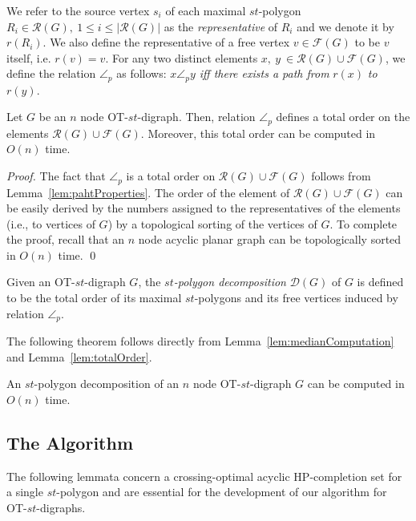 \documentclass{myllncs-mixalis}
\begin{document}
We refer to the source vertex $s_i$ of each maximal $st$-polygon
$R_i \in \mathcal{R}(G),~ 1 \leq i \leq |\mathcal{R}(G)|$ as the
\emph{representative} of $R_i$ and we denote it by $r(R_i)$. We also
define the representative of a free vertex $v\in \mathcal{F}(G)$ to
be $v$ itself, i.e. $r(v)=v$. For any two distinct elements $x, ~y~
\in \mathcal{R}(G) \cup \mathcal{F}(G)$, we define the  relation
$\angle_p$ as follows: \emph{$x \angle_p y$ iff there exists a path
from}  $r(x)$ \emph{to} $r(y)$.

\begin{lemma}
\label{lem:totalOrder}
 Let $G$ be an $n$ node OT-$st$-digraph. Then,
relation $\angle_p$ defines a total order on the elements
$\mathcal{R}(G) \cup \mathcal{F}(G)$. Moreover, this total order can
be computed in $O(n)$ time.
\end{lemma}

\begin{proof}
The fact that $\angle_p$ is a total order on $\mathcal{R}(G) \cup
\mathcal{F}(G)$
 follows from Lemma~\ref{lem:pahtProperties}. The  order of
 the element of $\mathcal{R}(G) \cup
\mathcal{F}(G)$ can be easily derived by the
 numbers assigned to the representatives of the elements (i.e., to
 vertices of $G$) by a topological sorting of the vertices of $G$.
 To complete the proof, recall that an $n$ node acyclic planar graph can be
 topologically sorted in $O(n)$ time.
\qed
\end{proof}

\begin{definition}
Given an OT-$st$-digraph $G$,  the \emph{$st$-polygon decomposition}
$\mathcal{D}(G)$ of $G$ is defined to be the total order of its
maximal $st$-polygons and its free vertices induced by relation
$\angle_p$.
\end{definition}

The following theorem follows directly from
Lemma~\ref{lem:medianComputation} and Lemma~\ref{lem:totalOrder}.

\begin{theorem}
\label{thm:STpolygonDecomposition} An $st$-polygon decomposition of
an $n$ node OT-$st$-digraph $G$ can be computed in $O(n)$ time.
\end{theorem}

\subsection{The Algorithm}

The following lemmata concern a crossing-optimal acyclic
HP-completion set for a single $st$-polygon and are essential for
the development of our   algorithm for OT-$st$-digraphs.
\end{document}
